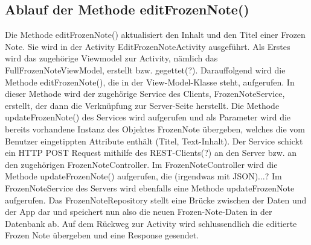 \subsection{Ablauf der Methode editFrozenNote()}

Die Methode editFrozenNote() aktualisiert den Inhalt und den Titel einer Frozen Note. Sie wird in der Activity EditFrozenNoteActivity ausgeführt. Als Erstes wird das zugehörige Viewmodel zur Activity, nämlich das FullFrozenNoteViewModel, erstellt bzw. gegettet(?). Darauffolgend wird die Methode editFrozenNote(), die in der View-Model-Klasse steht, aufgerufen. In dieser Methode wird der zugehörige Service des Clients, FrozenNoteService, erstellt, der dann die Verknüpfung zur Server-Seite herstellt. Die Methode updateFrozenNote() des Services wird aufgerufen und als Parameter wird die bereits vorhandene Instanz des Objektes FrozenNote übergeben, welches die vom Benutzer eingetippten Attribute enthält (Titel, Text-Inhalt). Der Service schickt ein HTTP POST Request mithilfe des REST-Clients(?) an den Server bzw. an den zugehörigen FrozenNoteController. Im FrozenNoteController wird die Methode updateFrozenNote() aufgerufen, die (irgendwas mit JSON)...? Im FrozenNoteService des Servers wird ebenfalls eine Methode updateFrozenNote aufgerufen. Das FrozenNoteRepository stellt eine Brücke zwischen der Daten und der App dar und speichert nun also die neuen Frozen-Note-Daten in der Datenbank ab. Auf dem Rückweg zur Activity wird schlussendlich die editierte Frozen Note übergeben und eine Response gesendet.
